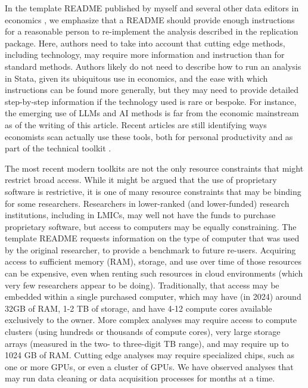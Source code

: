 \documentclass{article}
\begin{document}
In the template README published by myself and several other data editors in economics \parencite{templateREADMEv1.1}, we emphasize that a README should provide enough instructions for a reasonable person to re-implement the analysis described in the replication package. Here, authors need to take into account that cutting edge methods, including technology, may require more information and instruction than for standard methods. Authors likely do not need to describe how to run an analysis in Stata, given its ubiquitous use in economics, and the ease with which instructions can be found more generally, but they may need to provide detailed step-by-step information if the technology used is rare or bespoke. For instance, the emerging use of \acp{LLM} and \ac{AI} methods is far from the economic mainstream as of the writing of this article. Recent articles are still identifying ways economists scan actually use these tools, both for personal productivity \parencite{korinek_generative_2023} and as part of the technical toolkit \parencite{athey_machine_2019,dell_deep_2024}. 

The most recent modern toolkits are not the only resource constraints that might restrict broad access. While it might be argued that the use of proprietary software is restrictive, it is one of many resource constraints that may be binding for some researchers. Researchers in lower-ranked (and lower-funded) research institutions, including in \acp{LMIC}, may well not have the funds to purchase proprietary software, but access to computers may be equally constraining. The template README requests information on the type of computer that was used by the original researcher, to provide a benchmark to future re-users. Acquiring access to sufficient memory (\ac{RAM}), storage, and use over time of those resources can be expensive, even when renting such resources in cloud environments (which very few researchers appear to be doing). Traditionally, that access may be embedded within a single purchased computer, which may have (in 2024) around 32GB of RAM, 1-2 TB of storage, and have 4-12 compute cores available exclusively to the owner. More complex analyses may require access to compute clusters (using hundreds or thousands of compute cores), very large storage arrays (measured in the two- to three-digit TB range), and may require up to 1024 GB of RAM. Cutting edge analyses may require specialized chips, such as one or more \acp{GPU}, or even a cluster of \acp{GPU}. We have observed analyses that may run data cleaning or data acquisition processes for months at a time. 
\end{document}
